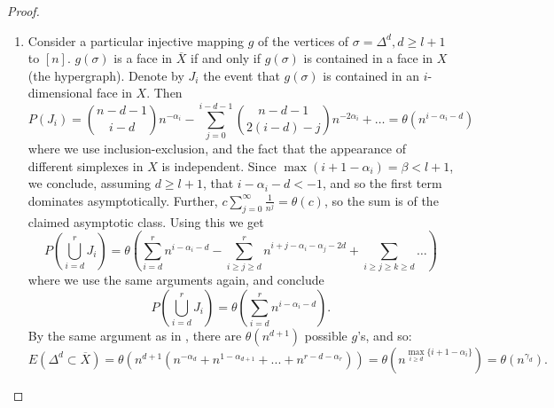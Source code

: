 \documentclass[10pt,a4paper]{amsart}
\newcommand{\di}{dimension}
\newcommand{\prs}[1]{\left( #1 \right)}
\begin{document}
\begin{proof} \begin{enumerate}
    \item Consider a particular injective mapping $g$ of the vertices of $\sigma=\Delta^d, d\ge l+1$ to $[n]$. $g(\sigma)$ is a face in $\overline{X}$ if and only if $g(\sigma)$ is contained in a face in $X$ (the hypergraph).
Denote by $J_i$ the event that $g(\sigma)$ is contained in an $i$-\di al face in $X$. Then 
$$P(J_i)=\binom{n-d-1}{i-d}n^{-\alpha_i}-\sum_{j=0}^{i-d-1}\binom{n-d-1}{2(i-d)-j}n^{-2\alpha_i}+\dots=\theta(n^{i-\alpha_i-d})$$
where we use inclusion-exclusion, and the fact that the appearance of different simplexes in $X$ is independent. Since $\max(i+1-\alpha_i)=\beta<l+1$, we conclude, assuming $d\ge l+1$, that $i-\alpha_i-d<-1$, and so the first term dominates asymptotically.
Further, $c\sum_{j=0} ^\infty\frac{1}{n^j}=\theta(c)$, so the sum is of the claimed asymptotic class.
Using this we get 
$$P\prs{\bigcup_{i=d} ^r J_i}=\theta\prs{\sum_{i=d} ^r n^{i-\alpha_i-d}-\sum_{i\ge j\ge d} ^r n^{i+j-\alpha_i-\alpha_j-2d}+ \sum_{i\ge j\ge k\ge d}\dots}$$
where we use the same arguments again, and conclude 
$$P\prs{\bigcup_{i=d} ^r J_i}=\theta\prs{\sum_{i=d} ^r n^{i-\alpha_i-d}}.$$
By the same argument as in , there are $\theta(n^{d+1})$ possible $g$'s, and so:
\begin{equation}\label{bugdetUpper}
    E(\Delta^{d}\subset \overline{X})=\theta(n^{d+1}(n^{-\alpha_d}+n^{1-\alpha_{d+1}}+...+n^{r-d-\alpha_r}))=\theta(n^{\max_{i\ge d}\{ i+1-\alpha_i\}})=\theta(n^{\gamma_d}).
\end{equation}


\end{enumerate}
\end{proof}
\end{document}
